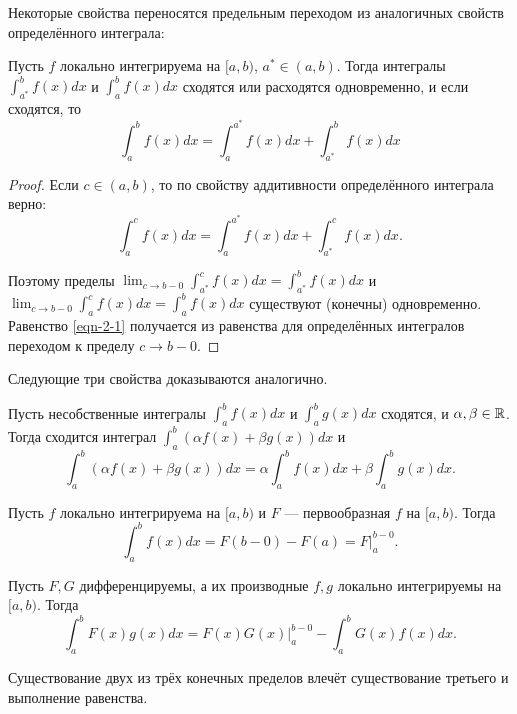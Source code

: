 Некоторые свойства переносятся предельным переходом из аналогичных свойств определённого интеграла:

\begin{property}
    Пусть $f$ локально интегрируема на $[a, b)$, $a^* \in (a, b)$. Тогда интегралы $\int_{a^*}^b f(x) dx$ и $\int_a^b f(x) dx$ сходятся или расходятся одновременно, и если сходятся, то
    \label{eqn-2-1}
    \begin{equation}
        \int_a^b f(x) dx = \int_a^{a^*} f(x) dx + \int_{a^*}^b f(x) dx
    \end{equation}

    \begin{proof}
        Если $c \in (a, b)$, то по свойству аддитивности определённого интеграла верно:
        \[
            \int_a^c f(x) dx = \int_a^{a^*} f(x) dx + \int_{a^*}^c f(x) dx.
        \]

        Поэтому пределы $\lim_{c \rightarrow b - 0} \int_{a^*}^{c} f(x) dx = \int_{a^*}^b f(x) dx$ и $\lim_{c \rightarrow b - 0} \int_a^c f(x) dx = \int_a^b f(x) dx$ существуют (конечны) одновременно. Равенство \ref{eqn-2-1} получается из равенства для определённых интегралов переходом к пределу $c \rightarrow b - 0$.
    \end{proof}
\end{property}

Следующие три свойства доказываются аналогично.

\begin{property}[линейность] 
    Пусть несобственные интегралы $\int_a^b f(x) dx$ и $\int_a^b g(x) dx$ сходятся, и $\alpha, \beta \in \mathbb{R}$. Тогда сходится интеграл $\int_a^b \left(\alpha f(x) + \beta g(x)\right) dx$ и
    \[
        \int_a^b \left(\alpha f(x) + \beta g(x)\right) dx = \alpha \int_a^b f(x) dx + \beta \int_a^b g(x) dx.
    \]
\end{property}

\begin{property}
    Пусть $f$ локально интегрируема на $[a, b)$ и $F$ --- первообразная $f$ на $[a, b)$. Тогда
    \[
        \int_a^b f(x) dx = F(b - 0) - F(a) = F \vert_a^{b - 0}.
    \]
\end{property}

\begin{property}
    Пусть $F, G$ дифференцируемы, а их производные $f, g$ локально интегрируемы на $[a, b)$. Тогда
    \[
        \int^b_a F(x) g(x) dx = F(x)G(x)\vert^{b - 0}_a - \int_a^b G(x) f(x) dx.
    \]

    Существование двух из трёх конечных пределов влечёт существование третьего и выполнение равенства.
\end{property}